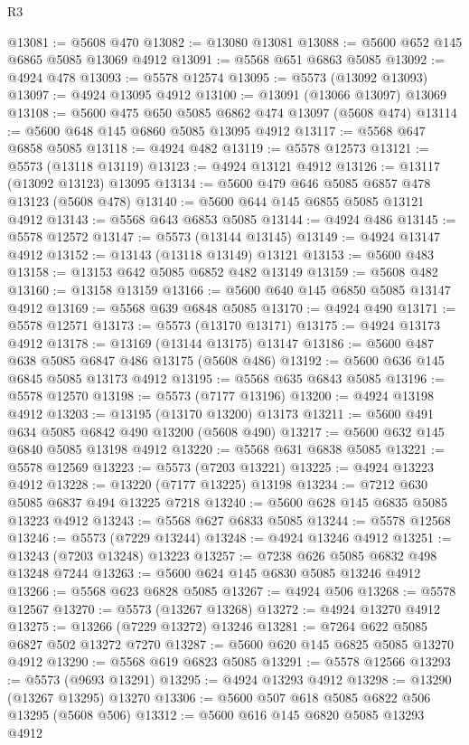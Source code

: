 \begin{lexlean}{R3}
\begin{coremodule}
@13081 := @5608 @470
@13082 := @13080 @13081
@13088 := @5600 @652 @145 @6865 @5085 @13069 @4912
@13091 := @5568 @651 @6863 @5085
@13092 := @4924 @478
@13093 := @5578 @12574
@13095 := @5573 (@13092 @13093)
@13097 := @4924 @13095 @4912
@13100 := @13091 (@13066 @13097) @13069
@13108 := @5600 @475 @650 @5085 @6862 @474 @13097 (@5608 @474)
@13114 := @5600 @648 @145 @6860 @5085 @13095 @4912
@13117 := @5568 @647 @6858 @5085
@13118 := @4924 @482
@13119 := @5578 @12573
@13121 := @5573 (@13118 @13119)
@13123 := @4924 @13121 @4912
@13126 := @13117 (@13092 @13123) @13095
@13134 := @5600 @479 @646 @5085 @6857 @478 @13123 (@5608 @478)
@13140 := @5600 @644 @145 @6855 @5085 @13121 @4912
@13143 := @5568 @643 @6853 @5085
@13144 := @4924 @486
@13145 := @5578 @12572
@13147 := @5573 (@13144 @13145)
@13149 := @4924 @13147 @4912
@13152 := @13143 (@13118 @13149) @13121
@13153 := @5600 @483
@13158 := @13153 @642 @5085 @6852 @482 @13149
@13159 := @5608 @482
@13160 := @13158 @13159
@13166 := @5600 @640 @145 @6850 @5085 @13147 @4912
@13169 := @5568 @639 @6848 @5085
@13170 := @4924 @490
@13171 := @5578 @12571
@13173 := @5573 (@13170 @13171)
@13175 := @4924 @13173 @4912
@13178 := @13169 (@13144 @13175) @13147
@13186 := @5600 @487 @638 @5085 @6847 @486 @13175 (@5608 @486)
@13192 := @5600 @636 @145 @6845 @5085 @13173 @4912
@13195 := @5568 @635 @6843 @5085
@13196 := @5578 @12570
@13198 := @5573 (@7177 @13196)
@13200 := @4924 @13198 @4912
@13203 := @13195 (@13170 @13200) @13173
@13211 := @5600 @491 @634 @5085 @6842 @490 @13200 (@5608 @490)
@13217 := @5600 @632 @145 @6840 @5085 @13198 @4912
@13220 := @5568 @631 @6838 @5085
@13221 := @5578 @12569
@13223 := @5573 (@7203 @13221)
@13225 := @4924 @13223 @4912
@13228 := @13220 (@7177 @13225) @13198
@13234 := @7212 @630 @5085 @6837 @494 @13225 @7218
@13240 := @5600 @628 @145 @6835 @5085 @13223 @4912
@13243 := @5568 @627 @6833 @5085
@13244 := @5578 @12568
@13246 := @5573 (@7229 @13244)
@13248 := @4924 @13246 @4912
@13251 := @13243 (@7203 @13248) @13223
@13257 := @7238 @626 @5085 @6832 @498 @13248 @7244
@13263 := @5600 @624 @145 @6830 @5085 @13246 @4912
@13266 := @5568 @623 @6828 @5085
@13267 := @4924 @506
@13268 := @5578 @12567
@13270 := @5573 (@13267 @13268)
@13272 := @4924 @13270 @4912
@13275 := @13266 (@7229 @13272) @13246
@13281 := @7264 @622 @5085 @6827 @502 @13272 @7270
@13287 := @5600 @620 @145 @6825 @5085 @13270 @4912
@13290 := @5568 @619 @6823 @5085
@13291 := @5578 @12566
@13293 := @5573 (@9693 @13291)
@13295 := @4924 @13293 @4912
@13298 := @13290 (@13267 @13295) @13270
@13306 := @5600 @507 @618 @5085 @6822 @506 @13295 (@5608 @506)
@13312 := @5600 @616 @145 @6820 @5085 @13293 @4912

\end{coremodule}
\end{lexlean}
